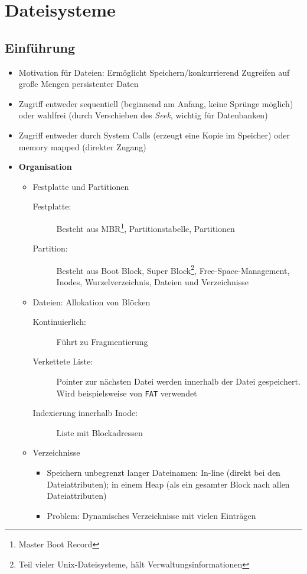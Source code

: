 \section{Dateisysteme}

\subsection{Einführung}
\begin{itemize}
	\item Motivation für Dateien: Ermöglicht Speichern/konkurrierend Zugreifen auf große Mengen persistenter Daten
	\item Zugriff entweder sequentiell (beginnend am Anfang, keine Sprünge möglich) oder wahlfrei (durch Verschieben des \textit{Seek}, wichtig für Datenbanken)
	\item Zugriff entweder durch System Calls (erzeugt eine Kopie im Speicher) oder memory mapped (direkter Zugang)
	\item \textbf{Organisation}
	\begin{itemize}
		\item Festplatte und Partitionen
		\begin{description}
			\item[Festplatte:] Besteht aus MBR\footnote{Master Boot Record}, Partitionstabelle, Partitionen
			\item[Partition:] Besteht aus Boot Block, Super Block\footnote{Teil vieler Unix-Dateisysteme, hält Verwaltungsinformationen}, Free-Space-Management, Inodes, Wurzelverzeichnis, Dateien und Verzeichnisse
		\end{description}
		\item Dateien: Allokation von Blöcken
		\begin{description}
			\item[Kontinuierlich:] Führt zu Fragmentierung
			\item[Verkettete Liste:] Pointer zur nächsten Datei werden innerhalb der Datei gespeichert. Wird beispielsweise von \texttt{FAT} verwendet
			\item[Indexierung innerhalb Inode:] Liste mit Blockadressen
		\end{description}
		\item Verzeichnisse
		\begin{itemize}
			\item Speichern unbegrenzt langer Dateinamen: In-line (direkt bei den Dateiattributen); in einem Heap (als ein gesamter Block nach allen Dateiattributen)
			\item Problem: Dynamisches Verzeichnisse mit vielen Einträgen
		\end{itemize}
	\end{itemize}
\end{itemize}



